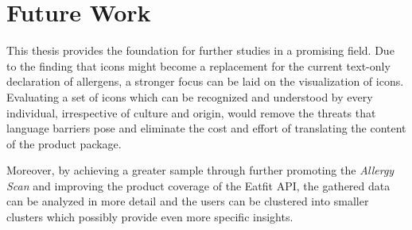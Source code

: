 \section{Future Work}
This thesis provides the foundation for further studies in a promising field. Due to the finding that icons might become a replacement for the current text-only declaration of allergens, a stronger focus can be laid on the visualization of icons. Evaluating a set of icons which can be recognized and understood by every individual, irrespective of culture and origin, would remove the threats that language barriers pose and eliminate the cost and effort of translating the content of the product package.

Moreover, by achieving a greater sample through further promoting the \emph{Allergy Scan} and improving the product coverage of the Eatfit API, the gathered data can be analyzed in more detail and the users can be clustered into smaller clusters which possibly provide even more specific insights. 